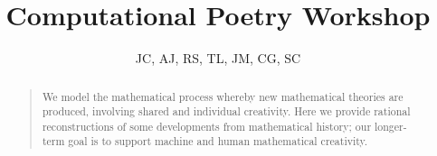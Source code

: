 \documentclass[letterpaper]{article}
\title{Computational Poetry Workshop}
\author{JC, AJ, RS, TL, JM, CG, SC}
\begin{document}
 
\maketitle
\begin{abstract}
\begin{quote}
We model the mathematical process whereby new mathematical
theories are produced, involving shared and individual creativity.
Here we provide rational reconstructions of some developments
from mathematical history;  our longer-term goal is to support
machine and human mathematical creativity.
\end{quote}
\end{abstract}









\nocite{poincare29}
\nocite{csik88}
\nocite{rhodes61}
\nocite{mackinnon70}
\nocite{jordanous11iccc}
\nocite{jordanous10}
\nocite{mcgraw93}
\nocite{perezyperez10MM}
\nocite{saunders12}
\nocite{sosa09}
\nocite{coltonwiggins12}
\nocite{pease10}

\printbibliography
\end{document}
